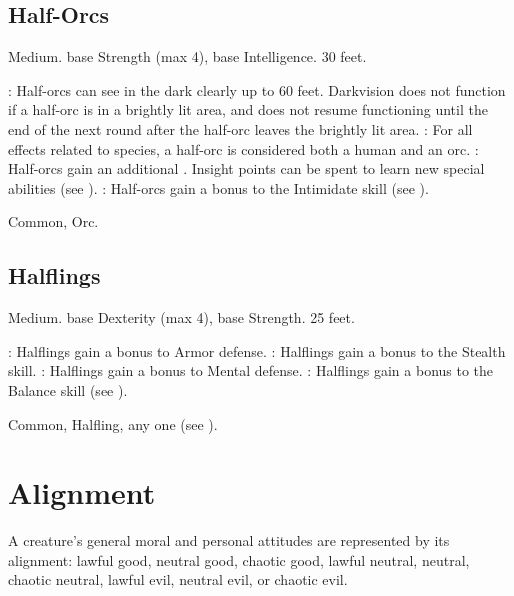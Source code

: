     \subsection{Half-Orcs}
         Medium.
          base Strength (max 4),  base Intelligence.
         30 feet.
        \begin{itemize}
            : Half-orcs can see in the dark clearly up to 60 feet. Darkvision does not function if a half-orc is in a brightly lit area, and does not resume functioning until the end of the next round after the half-orc leaves the brightly lit area.
            : For all effects related to species, a half-orc is considered both a human and an orc.
            : Half-orcs gain an additional .
                Insight points can be spent to learn new special abilities (see ).
            : Half-orcs gain a  bonus to the Intimidate skill (see ).
        \end{itemize}
         Common, Orc.

    \subsection{Halflings}
         Medium.
          base Dexterity (max 4),  base Strength.
         25 feet.
        \begin{itemize}
            : Halflings gain a  bonus to Armor defense.
            : Halflings gain a  bonus to the Stealth skill.
            : Halflings gain a  bonus to Mental defense.
            : Halflings gain a  bonus to the Balance skill (see ).
        \end{itemize}
         Common, Halfling, any one  (see ).

\section{Alignment}\label{Alignment}
    A creature's general moral and personal attitudes are represented by its alignment: lawful good, neutral good, chaotic good, lawful neutral, neutral, chaotic neutral, lawful evil, neutral evil, or chaotic evil.

